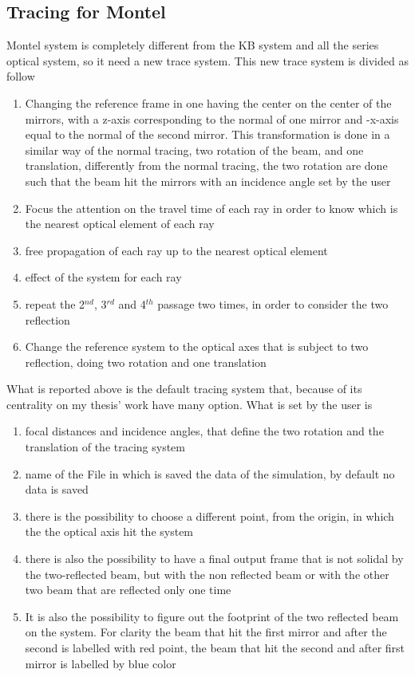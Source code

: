 \subsection{Tracing for Montel}
Montel system is completely different from the KB system and all the series optical system, so it need a new trace system. This new trace system is divided as follow
\begin{enumerate}
	\item Changing the reference frame in one having the center on the center of the mirrors, with a z-axis corresponding to the normal of one mirror and -x-axis equal to the normal of the second mirror. This transformation is done in a similar way of the normal tracing, two rotation of the beam, and one translation, differently from the normal tracing, the two rotation are done such that the beam hit the mirrors with an incidence angle set by the user
	\item Focus the attention on the travel time of each ray in order to know which is the nearest optical element of each ray
	\item free propagation of each ray up to the nearest optical element
	\item effect of the system for each ray
	\item repeat the 2$^{nd} $, 3$^{rd} $ and 4$^{th} $ passage two times, in order to consider the two reflection
	\item Change the reference system to the optical axes that is subject to two reflection, doing two rotation and one translation
\end{enumerate}  

\noindent What is reported above is the default tracing system that, because of its centrality on my thesis' work have many option. What is set by the user is 
\begin{enumerate}
	\item focal distances and incidence angles, that define the two rotation and the translation of the tracing system
	\item name of the File in which is saved the data of the simulation, by default no data is saved
	\item there is the possibility to choose a different point, from the origin, in which the the optical axis hit the system
	\item there is also the possibility to have a final output frame that is not solidal by the two-reflected beam, but with the non reflected beam or with the other two beam that are reflected only one time
	\item It is also the possibility to figure out the footprint of the two reflected beam on the system. For clarity the beam that hit the first mirror and after the second is labelled with red point, the beam that hit the second and after first mirror is labelled by blue color
\end{enumerate}

